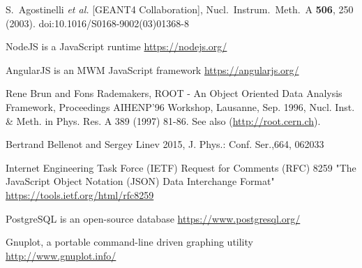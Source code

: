 \begin{thebibliography}{}
%
%
S.~Agostinelli {\it et al.} [GEANT4 Collaboration],
  Nucl.\ Instrum.\ Meth.\ A {\bf 506}, 250 (2003).
  doi:10.1016/S0168-9002(03)01368-8



NodeJS is a JavaScript runtime \url{https://nodejs.org/}

AngularJS is an MWM JavaScript framework \url{https://angularjs.org/}

    Rene Brun and Fons Rademakers,
    ROOT - An Object Oriented Data Analysis Framework,
    Proceedings AIHENP'96 Workshop, Lausanne, Sep. 1996, Nucl. Inst. \& Meth. in Phys. Res. A 389 (1997) 81-86. See also (\url{http://root.cern.ch}).

Bertrand Bellenot and Sergey Linev 2015, J. Phys.: Conf. Ser.,664,  062033

Internet Engineering Task Force (IETF) Request for Comments (RFC) 8259 "The JavaScript Object Notation (JSON) Data Interchange Format" \url{https://tools.ietf.org/html/rfc8259}

PostgreSQL is an open-source database \url{https://www.postgresql.org/}

Gnuplot, a portable command-line driven graphing utility \url{http://www.gnuplot.info/}

\end{thebibliography}